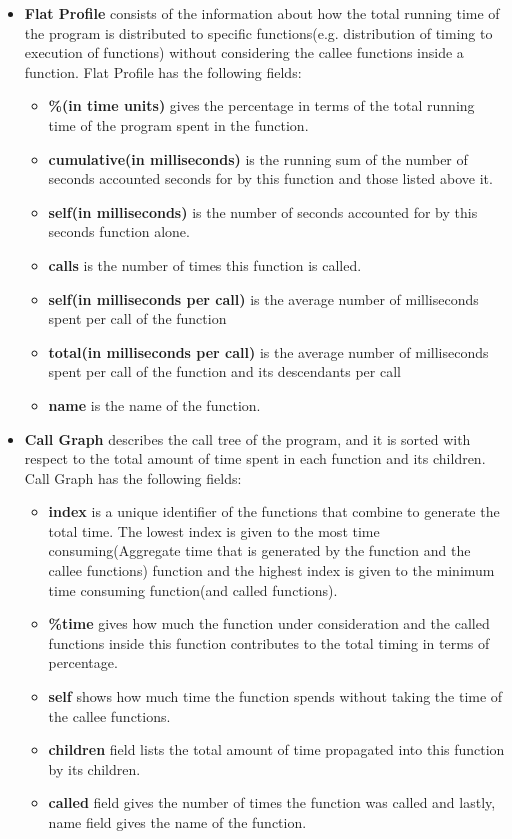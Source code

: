\documentclass{article}
\begin{document}
\begin{itemize}
    \item \textbf{Flat Profile} consists of the information about how the total running time of the program is distributed to specific functions(e.g. distribution of timing to execution of functions) without considering the callee functions inside a function. Flat Profile has the following fields:
        \begin{itemize}
            \item \textbf{\%(in time units)} gives the percentage in terms of the total running time of the program spent in the function.
            \item \textbf{cumulative(in milliseconds)} is the running sum of the number of seconds accounted seconds for by this function and those listed above it.
            \item \textbf{self(in milliseconds)} is the number of seconds accounted for by this seconds function alone.
            \item \textbf{calls} is the number of times this function is called.
            \item \textbf{self(in milliseconds per call)} is the average number of milliseconds spent per call of the function 
            \item \textbf{total(in milliseconds per call)} is the average number of milliseconds spent per call of the function and its descendants per call
            \item \textbf{name} is the name of the function.
        \end{itemize}   
    \item \textbf{Call Graph} describes the call tree of the program, and it is sorted with respect to the total amount of time spent in each function and its children. Call Graph has the following fields: 
        \begin{itemize}
            \item \textbf{index} is a unique identifier of the functions that combine to generate the total time. The lowest index is given to the most time consuming(Aggregate time that is generated by the function and the callee functions) function and the highest index is given to the minimum time consuming function(and called functions). 
            \item \textbf{\%time} gives how much the function under consideration and the called functions inside this function contributes to the total timing in terms of percentage.
            \item \textbf{self} shows how much time the function spends without taking the time of the callee functions.
            \item \textbf{children} field lists the total amount of time propagated into this function by its children.
            \item \textbf{called} field gives the number of times the function was called and lastly, name field gives the name of the function.
        \end{itemize}   
\end{itemize}
\end{document}
